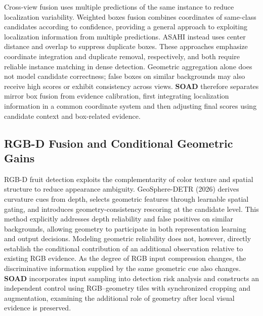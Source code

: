 \documentclass[11pt,a4paper]{article}
\begin{document}
Cross-view fusion uses multiple predictions of the same instance to reduce localization variability. Weighted boxes fusion \cite{wbf} combines coordinates of same-class candidates according to confidence, providing a general approach to exploiting localization information from multiple predictions. ASAHI \cite{asahi} instead uses center distance and overlap to suppress duplicate boxes. These approaches emphasize coordinate integration and duplicate removal, respectively, and both require reliable instance matching in dense detection. Geometric aggregation alone does not model candidate correctness; false boxes on similar backgrounds may also receive high scores or exhibit consistency across views. \textbf{SOAD} therefore separates mirror box fusion from evidence calibration, first integrating localization information in a common coordinate system and then adjusting final scores using candidate context and box-related evidence.

\subsection{RGB-D Fusion and Conditional Geometric Gains}
RGB-D fruit detection exploits the complementarity of color texture and spatial structure to reduce appearance ambiguity. GeoSphere-DETR (2026) \cite{geosphere} derives curvature cues from depth, selects geometric features through learnable spatial gating, and introduces geometry-consistency rescoring at the candidate level. This method explicitly addresses depth reliability and false positives on similar backgrounds, allowing geometry to participate in both representation learning and output decisions. Modeling geometric reliability does not, however, directly establish the conditional contribution of an additional observation relative to existing RGB evidence. As the degree of RGB input compression changes, the discriminative information supplied by the same geometric cue also changes. \textbf{SOAD} incorporates input sampling into detection risk analysis and constructs an independent control using RGB--geometry tiles with synchronized cropping and augmentation, examining the additional role of geometry after local visual evidence is preserved.
\end{document}
